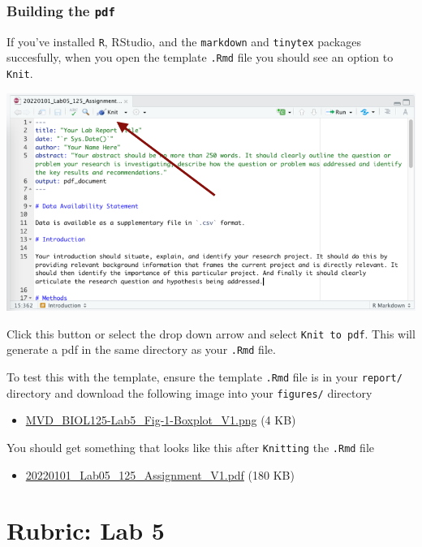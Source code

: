 \documentclass[
]{book}
\providecommand{\tightlist}{%
  \setlength{\itemsep}{0pt}\setlength{\parskip}{0pt}}
\begin{document}
\hypertarget{building-the-pdf}{%
\subsection*{\texorpdfstring{Building the \texttt{pdf}}{Building the pdf}}\label{building-the-pdf}}

If you've installed \texttt{R}, RStudio, and the \texttt{markdown} and \texttt{tinytex} packages succesfully, when you open the template \texttt{.Rmd} file you should see an option to \texttt{Knit}.

\includegraphics{images/Knit_20220101.png}

Click this button or select the drop down arrow and select \texttt{Knit\ to\ pdf}. This will generate a pdf in the same directory as your \texttt{.Rmd} file.

To test this with the template, ensure the template \texttt{.Rmd} file is in your \texttt{report/} directory and download the following image into your \texttt{figures/} directory

\begin{itemize}
\tightlist
\item
  \href{files/figures/MVD_BIOL125-Lab5_Fig-1-Boxplot_V1.png}{MVD\_BIOL125-Lab5\_Fig-1-Boxplot\_V1.png} (4 KB)
\end{itemize}

You should get something that looks like this after \texttt{Knitting} the \texttt{.Rmd} file

\begin{itemize}
\tightlist
\item
  \href{files/20220101_Lab05_125_Assignment_V1.pdf}{20220101\_Lab05\_125\_Assignment\_V1.pdf} (180 KB)
\end{itemize}

\hypertarget{rubric-lab-5}{%
\chapter*{Rubric: Lab 5}\label{rubric-lab-5}}
\end{document}
